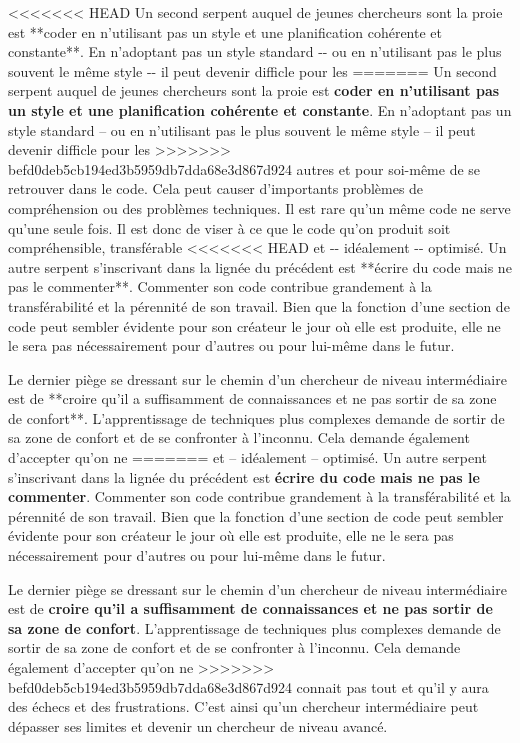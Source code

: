 \documentclass[
  letterpaper,
]{scrbook}
\begin{document}
<<<<<<< HEAD
Un second serpent auquel de jeunes chercheurs sont la proie est **coder
en n'utilisant pas un style et une planification cohérente et
constante**. En n'adoptant pas un style standard -\/- ou en n'utilisant
pas le plus souvent le même style -\/- il peut devenir difficle pour les
=======
Un second serpent auquel de jeunes chercheurs sont la proie est
\textbf{coder en n'utilisant pas un style et une planification cohérente
et constante}. En n'adoptant pas un style standard -- ou en n'utilisant
pas le plus souvent le même style -- il peut devenir difficle pour les
>>>>>>> befd0deb5cb194ed3b5959db7dda68e3d867d924
autres et pour soi-même de se retrouver dans le code. Cela peut causer
d'importants problèmes de compréhension ou des problèmes techniques. Il
est rare qu'un même code ne serve qu'une seule fois. Il est donc de
viser à ce que le code qu'on produit soit compréhensible, transférable
<<<<<<< HEAD
et -\/- idéalement -\/- optimisé. Un autre serpent s'inscrivant dans la
lignée du précédent est **écrire du code mais ne pas le commenter**.
Commenter son code contribue grandement à la transférabilité et la
pérennité de son travail. Bien que la fonction d'une section de code
peut sembler évidente pour son créateur le jour où elle est produite,
elle ne le sera pas nécessairement pour d'autres ou pour lui-même dans
le futur.

Le dernier piège se dressant sur le chemin d'un chercheur de niveau
intermédiaire est de **croire qu'il a suffisamment de connaissances et
ne pas sortir de sa zone de confort**. L'apprentissage de techniques
plus complexes demande de sortir de sa zone de confort et de se
confronter à l'inconnu. Cela demande également d'accepter qu'on ne
=======
et -- idéalement -- optimisé. Un autre serpent s'inscrivant dans la
lignée du précédent est \textbf{écrire du code mais ne pas le
commenter}. Commenter son code contribue grandement à la transférabilité
et la pérennité de son travail. Bien que la fonction d'une section de
code peut sembler évidente pour son créateur le jour où elle est
produite, elle ne le sera pas nécessairement pour d'autres ou pour
lui-même dans le futur.

Le dernier piège se dressant sur le chemin d'un chercheur de niveau
intermédiaire est de \textbf{croire qu'il a suffisamment de
connaissances et ne pas sortir de sa zone de confort}. L'apprentissage
de techniques plus complexes demande de sortir de sa zone de confort et
de se confronter à l'inconnu. Cela demande également d'accepter qu'on ne
>>>>>>> befd0deb5cb194ed3b5959db7dda68e3d867d924
connait pas tout et qu'il y aura des échecs et des frustrations. C'est
ainsi qu'un chercheur intermédiaire peut dépasser ses limites et devenir
un chercheur de niveau avancé.
\end{document}

